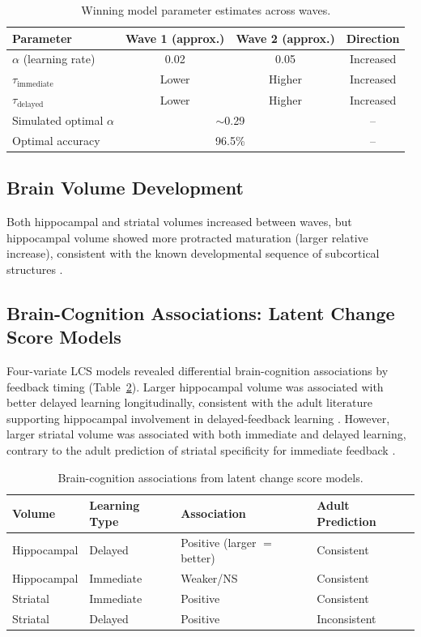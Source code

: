 \documentclass[12pt]{article}
\begin{document}
\begin{table}[htbp]
\centering
\caption{Winning model parameter estimates across waves.}
\label{tab:params}
\begin{tabular}{lccc}
\toprule
Parameter & Wave 1 (approx.) & Wave 2 (approx.) & Direction \\
\midrule
$\alpha$ (learning rate) & 0.02 & 0.05 & Increased \\
$\tau_\text{immediate}$ & Lower & Higher & Increased \\
$\tau_\text{delayed}$ & Lower & Higher & Increased \\
Simulated optimal $\alpha$ & \multicolumn{2}{c}{$\sim$0.29} & -- \\
Optimal accuracy & \multicolumn{2}{c}{96.5\%} & -- \\
\bottomrule
\end{tabular}
\end{table}

\subsection{Brain Volume Development}

Both hippocampal and striatal volumes increased between waves, but hippocampal volume showed more protracted maturation (larger relative increase), consistent with the known developmental sequence of subcortical structures \citep{goddings2014puberty}.

\subsection{Brain-Cognition Associations: Latent Change Score Models}

Four-variate LCS models revealed differential brain-cognition associations by feedback timing (Table~\ref{tab:lcs}). Larger hippocampal volume was associated with better delayed learning longitudinally, consistent with the adult literature supporting hippocampal involvement in delayed-feedback learning \citep{foerde2006hippocampus}. However, larger striatal volume was associated with both immediate and delayed learning, contrary to the adult prediction of striatal specificity for immediate feedback \citep{frank2004carrot, shohamy2008striatum}.

\begin{table}[htbp]
\centering
\caption{Brain-cognition associations from latent change score models.}
\label{tab:lcs}
\begin{tabular}{llll}
\toprule
Volume & Learning Type & Association & Adult Prediction \\
\midrule
Hippocampal & Delayed & Positive (larger $=$ better) & Consistent \\
Hippocampal & Immediate & Weaker/NS & Consistent \\
Striatal & Immediate & Positive & Consistent \\
Striatal & Delayed & Positive & Inconsistent \\
\bottomrule
\end{tabular}
\end{table}
\end{document}
